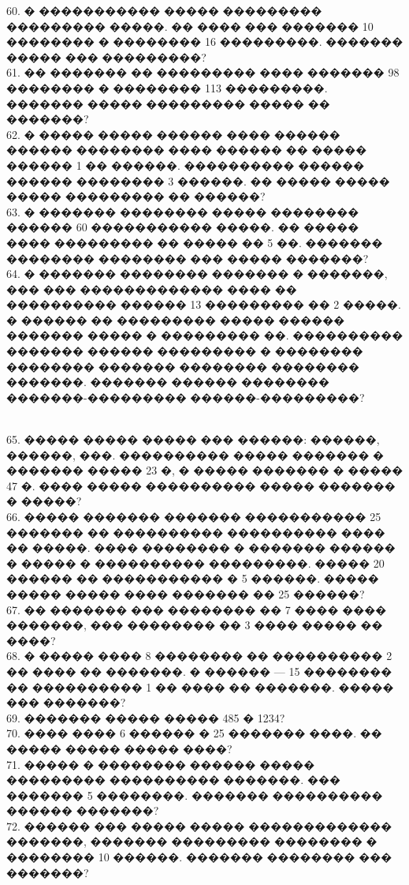 \documentclass[12pt]{article}
\begin{document}
60. � ����������� ����� ��������� ��������� �����. �� ���� ��� ������� 10 �������� � �������� 16 ���������. ������� ����� ��� ���������?\\
61. �� ������� �� ��������� ���� ������� 98 �������� � �������� 113 ���������. ������� ����� ��������� ����� �� �������?\\
62. � ����� ����� ������ ���� ������ ������ �������� ���� ������ �� ����� ������ 1 �� ������. ���������� ������ ������ �������� 3 ������. �� ����� ����� ����� ��������� �� ������?\\
63. � ������� �������� ����� �������� ������ 60 ����������� �����. �� ����� ���� ��������� �� ����� �� 5 ��. ������� �������� �������� ��� ����� �������?\\
64. � ������� �������� ������� � �������, ��� ��� ������������� ���� �� ���������� ������ 13 ��������� �� 2 �����. � ������ �� ��������� ����� ������ ������� ����� � ��������� ��. ���������� ������� ������ ��������� � �������� �������� ������� �������� �������� �������. ������� ������ �������� �������-��������� ������-���������?
\begin{figure}[h]
\end{figure}\\
65. ����� ����� ����� ��� ������: ������, ������, ���. ���������� ����� ������� � ������� ����� 23 �, � ����� ������� � ����� 47 �. ���� ����� ���������� ����� ������� � �����?\\
66. ����� ������� ������� ����������� 25 ������� �� ���������� ���������� ���� �� �����. ���� �������� � ������� ������ � ����� � ���������� ���������. ����� 20 ������ �� ����������� � 5 ������. ����� ����� ����� ���� ������� �� 25 ������?\\
67. �� ������� ��� �������� �� 7 ���� ���� �������, ��� �������� �� 3 ���� ����� �� ����?\\
68. � ����� ���� 8 �������� �� ���������� 2 �� ���� �� �������. � ������ --- 15 �������� �� ���������� 1 �� ���� �� �������. ����� ��� �������?\\
69. ������� ����� ����� 485 �  1234?\\
70. ���� ���� 6 ������ � 25 ������� ����. �� ����� ����� ����� ����?\\
71. ����� � �������� ������ ����� ��������� ���������� �������. ��� ������� 5 ��������. ������� ���������� ������ �������?\\
72. ������ ��� ����� ����� ������������� �������, ������� ��������� �������� � �������� 10 ������. ������� �������� ��� �������?\\
\end{document}
